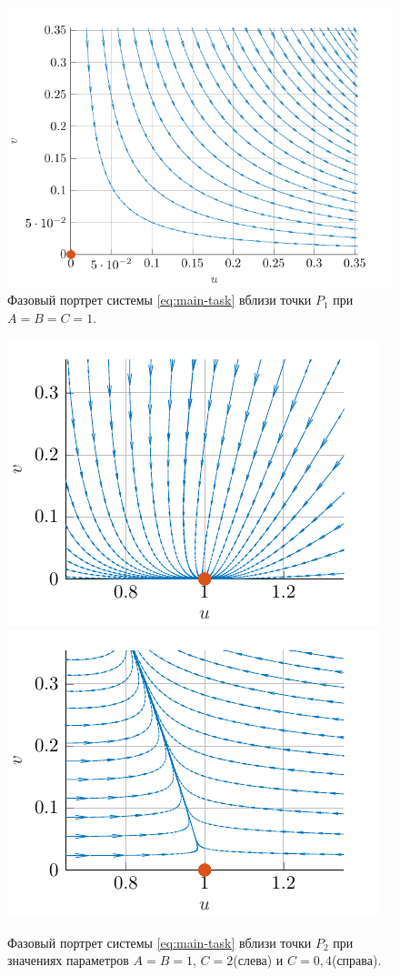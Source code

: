 \documentclass[a4paper, 11pt]{article}
\begin{document}
	\clearpage
		\begin{figure}[t]
			\centering
			\includegraphics[width=0.7\linewidth]{schema/p1.schema.pdf}
			\caption{Фазовый портрет системы \eqref{eq:main-task} вблизи точки $P_1$ при $A=B=C=1$.}
		\end{figure}
		\begin{figure}[b]
			\includegraphics[width=0.45\linewidth]{schema/p2_1.schema.pdf}
			\includegraphics[width=0.45\linewidth]{schema/p2_2.schema.pdf}
		\caption{Фазовый портрет системы \eqref{eq:main-task} вблизи точки $P_2$ при значениях параметров $A=B=1$, $C = 2$(слева) и $C=0,\!4$(справа).}
	\end{figure}
\end{document}
